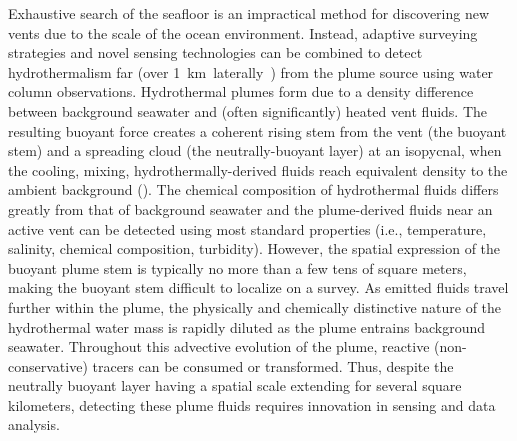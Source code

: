 Exhaustive search of the seafloor is an impractical method for discovering new vents due to the scale of the ocean environment. Instead, adaptive surveying strategies and novel sensing technologies can be combined to detect hydrothermalism far (over \SI{1}{\kilo\meter laterally)} from the plume source using water column observations. Hydrothermal plumes form due to a density difference between background seawater and (often significantly) heated vent fluids. The resulting buoyant force creates a coherent rising stem from the vent (the buoyant stem) and a spreading cloud (the neutrally-buoyant layer) at an isopycnal, when the cooling, mixing, hydrothermally-derived fluids reach equivalent density to the ambient background (\cite{morton1956turbulent, speer1989model}). The chemical composition of hydrothermal fluids differs greatly from that of background seawater and the plume-derived fluids near an active vent can be detected using most standard properties (i.e., temperature, salinity, chemical composition, turbidity). However, the spatial expression of the buoyant plume stem is typically no more than a few tens of square meters, making the buoyant stem difficult to localize on a survey. As emitted fluids travel further within the plume, the physically and chemically distinctive nature of the hydrothermal water mass is rapidly diluted as the plume entrains background seawater. Throughout this advective evolution of the plume, reactive (non-conservative) tracers can be consumed or transformed. Thus, despite the neutrally buoyant layer having a spatial scale extending for several square kilometers, detecting these plume fluids requires innovation in sensing and data analysis.

